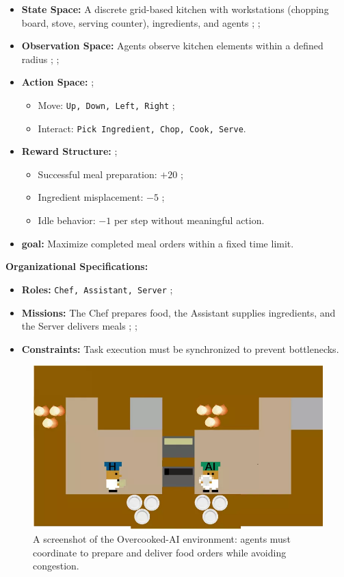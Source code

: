 \documentclass[pdflatex,sn-mathphys-num]{sn-jnl}%
\theoremstyle{thmstyleone}%
\theoremstyle{thmstyletwo}%
\theoremstyle{thmstylethree}%
\begin{document}
\begin{itemize}
    \item \textbf{State Space:} A discrete grid-based kitchen with workstations (chopping board, stove, serving counter), ingredients, and agents ; ;
    \item \textbf{Observation Space:} Agents observe kitchen elements within a defined radius ; ;
    \item \textbf{Action Space:}  ;
    \begin{itemize}
        \item Move: \texttt{Up, Down, Left, Right} ;
        \item Interact: \texttt{Pick Ingredient, Chop, Cook, Serve}.
    \end{itemize}
    \item \textbf{Reward Structure:} ;
    \begin{itemize}
        \item Successful meal preparation: $+20$ ;
        \item Ingredient misplacement: $-5$ ;
        \item Idle behavior: $-1$ per step without meaningful action.
    \end{itemize}
    \item \textbf{goal:} Maximize completed meal orders within a fixed time limit.
\end{itemize}

\textbf{Organizational Specifications:} 
\begin{itemize}
    \item \textbf{Roles:} \texttt{Chef, Assistant, Server} ;
    \item \textbf{Missions:} The Chef prepares food, the Assistant supplies ingredients, and the Server delivers meals ; ;
    \item \textbf{Constraints:} Task execution must be synchronized to prevent bottlenecks.
\end{itemize}

\begin{figure}[h!]
    \centering
    \includegraphics[width=0.7\linewidth]{figures/overcooked.png}
    \caption{A screenshot of the Overcooked-AI environment: agents must coordinate to prepare and deliver food orders while avoiding congestion.}
    \label{fig:overcooked}
\end{figure}
\end{document}
